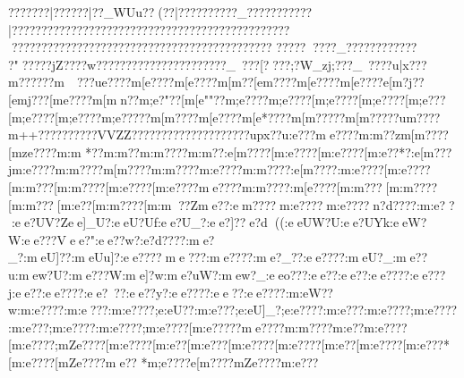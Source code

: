 {{{{{{{{{{{{{{{{{{{{{{{{{{{{{{{{{{{{{{{{{{{{{{{{{{{{{{{{{{{{{{{{{{{{{{{{{{{{{{{{{{{{{{{{{{{{{{{{{{{{{{{{{{{{{{{{{{{{{{{{{{{{{{{{{{{{{{{{{{{{{{{{{{{{{{{{{{{{{{{{{{{{{{{{{{{{{{{{{{{{{{{{{{{{{{{{{{{{{{{{{{{{{{{{{{{{{{{{{{{{{{{{{{{{{{{{{{{{{{{{{{{{{{{{{{{{{{{{{{{{{{{{{{{{{{{{{{{{{{{{{{{{{{{{{{{{{{{{{{{{{{{{{{{{{{{{{{{{{{{{{{{{{{{{{{{{{{{{{{{{{{{{{{{{{{{{{{{{{{{{{{{{{{{{{{{{{{{{{{{{{{{{{{{{{{{{{{{{{{{{{{{{{{{{{{{{{{{{{{{{{{{{{{{{{{{{{{{{{{{{{{{{{{{{{{{{{{{{{{{{{{{{{{{{{{{{{{{{{{{{{{{{{{{{{{{{{{{{{{{{{{{{{{{{{{{{{{{{{{{{{{{{{{{{{{{{{{{{{{{{{{{{{{{{{{{{{{{{{{{{{{{{{{{{{{{{{{{{{{{{{{{{{{{{{{{{{{{{{{{{{{{{{{{{{{{{{{{{{{{{{{{{{{{{{{{{{{{{{{{{{{{{{{{{{{{{{{{{{{{{{{{{{{{{{{{{{{{{{{{{{{{{{{{{{{{{{{{{{{{{{{{{{{{{{{{{{{{{{{{{{{{{{{{{{{{{{{{{{{{{{{{{{{{{{{{{{{{{{{{{{{{{{{{{{{{{{{{{{{{{{{{{{{{{{{{{{{{{{{{{{{{{{{{{{{{{{{{{{{{{{{{{{{{{{{{{{{{{{{{{{{{{{{{{{{{{{{{{{{{{{{{{{{{{{{{{{{{{{{{{{{{{??{?\?????|?{?????|?{?_WUu{?{?(??|?{???????{??_????{???????|???????{???????????????????????????????????????????????????????????????????????????????????? 
?????  ????_????????????
?"?????jZ????w??????????????  ??{?????{?_~??{?[???{?;?W_zj;???_~????u|x??}?m?????}?m~~???u{e????{m[e????{m[e????{m[m??[e{m????{m[e????{m[e????{e[m?j??[e{mj???[m{e????{m[mn??{m;e?"??[m[e""??{m;e????{m;e????[m;e????[m;e????[m;e???[m;e????[m;e????{m;e?????m[m????{m[e????{m[e*????m[m?????m[m?????u{m????}{m++????}?????}?VVZZ????????????????????{upx??u:e???{me????{m:m??zm[m????[mze????{m:m
*??{m:m??{m:m????{m:m??:e[m????[m:e????[m:e????[m:e??*?:e[m???j{m:e????{m:m????{m[m????{m:m????{m:e????{m:m????:e[m????:m:e????[m:e????[m:m???[m:m????[m:e????[m:e????{me????{m:m????:m[e????[m:m???[m:m????[m:m???[m:e??[m:m????[m:m??Zme??:em????m:e????m:e????n?d????:m:e??:ee?UV?Zee]_U?:eeU?Uf:ee?U_?:ee?]??e?d((:eeUW?U:ee?UYk:eeW?}W:ee???Vee?  ":ee??w?:e?d????:me?_}?:meU]??:meUu]?:ee????me???:me????:me?_??:ee????:meU?_}:me}??u:mew?U?:me???W:me]?}w:me?uW?:mew?}_:eeo???:ee??:ee??:ee????:ee???j:ee??:ee????:ee?~??:ee??y?:ee????:ee??:ee????:m:eW??w:m:e????:m:e???:m:e????;e:eU?}?:m:e}???;e:eU]_?;e:e????:m:e??}?:m:e????;m:e????:m:e???;m:e????:m:e????;m:e????[m:e?????me????{m:m????{m:e??{m:e????[m:e????;mZe????[m:e????[m:e??[m:e???[m:e????[m:e????[m:e??[m:e????[m:e???*[m:e????[mZe????{me??
*{m;e????{e[m????{mZe????{m:e???
}}}}}}}}}}}}}}}}}}}}}}}}}}}}}}}}}}}}}}}}}}}}}}}}}}}}}}}}}}}}}}}}}}}}}}}}}}}}}}}}}}}}}}}}}}}}}}}}}}}}}}}}}}}}}}}}}}}}}}}}}}}}}}}}}}}}}}}}}}}}}}}}}}}}}}}}}}}}}}}}}}}}}}}}}}}}}}}}}}}}}}}}}}}}}}}}}}}}}}}}}}}}}}}}}}}}}}}}}}}}}}}}}}}}}}}}}}}}}}}}}}}}}}}}}}}}}}}}}}}}}}}}}}}}}}}}}}}}}}}}}}}}}}}}}}}}}}}}}}}}}}}}}}}}}}}}}}}}}}}}}}}}}}}}}}}}}}}}}}}}}}}}}}}}}}}}}}}}}}}}}}}}}}}}}}}}}}}}}}}}}}}}}}}}}}}}}}}}}}}}}}}}}}}}}}}}}}}}}}}}}}}}}}}}}}}}}}}}}}}}}}}}}}}}}}}}}}}}}}}}}}}}}}}}}}}}}}}}}}}}}}}}}}}}}}}}}}}}}}}}}}}}}}}}}}}}}}}}}}}}}}}}}}}}}}}}}}}}}}}}}}}}}}}}}}}}}}}}}}}}}}}}}}}}}}}}}}}}}}}}}}}}}}}}}}}}}}}}}}}}}}}}}}}}}}}}}}}}}}}}}}}}}}}}}}}}}}}}}}}}}}}}}}}}}}}}}}}}}}}}}}}}}}}}}}}}}}}}}}}}}}}}}}}}}}}}}}}}}}}}}}}}}}}}}}}}}}}}}}}}}}}}}}}}}}}}}}}}}}}}}}}}}}}}}}}}}}}}}}}}}}}}}}}}}}}}}}}}}}}}}}}}}}}}}}}}}}}}}}}}}}}}}}}}}}}}}}}}}}}}}}}}}}}}}}}}}}}}}}}}}}}}}}}}}}}}}}}}}}}}}}}}}}}}}}}}}}}}}}}}}}}}}}}}}}}}}}}}}}}}}}}}}}}}}}}}}}}}}}}}}}}}}
